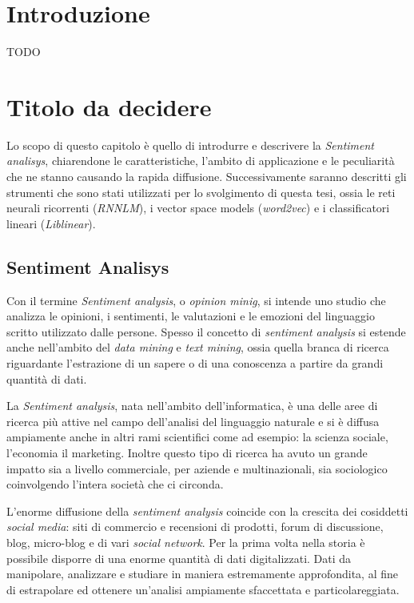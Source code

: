 \documentclass[a4paper,12pt,openright,twoside]{report}
\theoremstyle{definition}
\begin{document}
\chapter{Introduzione}
TODO

\chapter{Titolo da decidere}
Lo scopo di questo capitolo è quello di introdurre e descrivere la 
\emph{Sentiment analisys}, chiarendone le caratteristiche, l'ambito di applicazione e 
le peculiarità che ne stanno causando la rapida diffusione. 
Successivamente saranno descritti gli strumenti che sono stati utilizzati per lo svolgimento di questa tesi,
ossia le reti neurali ricorrenti (\emph{RNNLM}), i vector space models (\emph{word2vec}) e 
i classificatori lineari (\emph{Liblinear}).

\section{Sentiment Analisys}
Con il termine \emph{Sentiment analysis}, o \emph{opinion minig}, si intende uno studio 
che analizza le opinioni, i sentimenti, le valutazioni e le
emozioni del linguaggio scritto utilizzato dalle persone.
Spesso il concetto di \emph{sentiment analysis} si estende anche nell'ambito del \emph{data mining} e
\emph{text mining}, ossia quella branca di ricerca riguardante l'estrazione di un sapere o 
di una conoscenza a partire da grandi quantità di dati.

La \emph{Sentiment analysis}, nata nell'ambito dell'informatica, è una delle aree di ricerca più attive 
nel campo dell'analisi del linguaggio naturale e si è diffusa
ampiamente anche in altri rami scientifici come ad esempio: la scienza sociale,
l'economia il marketing. Inoltre questo tipo di ricerca
ha avuto un grande impatto sia a livello commerciale, per aziende e multinazionali, sia sociologico 
coinvolgendo l'intera società che ci circonda.

L'enorme diffusione della \emph{sentiment analysis} coincide con la 
crescita dei cosiddetti \emph{social media}: siti di commercio e recensioni di prodotti,
forum di discussione, blog, micro-blog e di vari \emph{social network}.
Per la prima volta nella storia è possibile disporre di una
enorme quantità di dati digitalizzati. Dati da manipolare, analizzare e studiare in maniera
estremamente approfondita, al fine di estrapolare ed ottenere un'analisi
ampiamente sfaccettata e particolareggiata.
\end{document}
